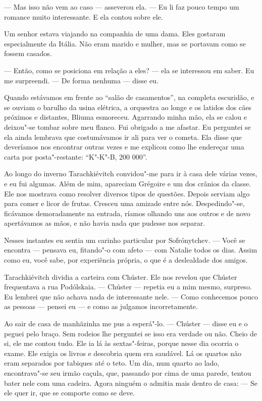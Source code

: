 --- Mas isso não vem ao caso --- asseverou ela. --- Eu li faz pouco
tempo um romance muito interessante. E ela contou sobre ele.

Um senhor estava viajando na companhia de uma dama. Eles gostaram
especialmente da Itália. Não eram marido e mulher, mas se portavam como
se fossem casados.

--- Então, como se posiciona em relação a eles? --- ela se interessou em
saber. Eu me surpreendi. --- De forma nenhuma --- disse eu.

Quando estávamos em frente ao ``salão de casamentos'', na completa
escuridão, e se ouviam o barulho da usina elétrica, a orquestra ao longe
e os latidos dos cães próximos e distantes, Bliuma esmoreceu. Agarrando
minha mão, ela se calou e deixou"-se tombar sobre meu flanco. Fui
obrigado a me afastar. Eu perguntei se ela ainda lembrava que
costumávamos ir ali para ver o cometa. Ela disse que deveríamos nos
encontrar outras vezes e me explicou como lhe endereçar uma carta por
posta"-restante: ``K"-K"-B, 200 000''.

Ao longo do inverno Tarachkiévitch convidou"-me para ir à casa dele
várias vezes, e eu fui algumas. Além de mim, apareciam Grégoire e um dos
crânios da classe. Ele nos mostrava como resolver diversos tipos de
questões. Depois serviam algo para comer e licor de frutas. Cresceu uma
amizade entre nós. Despedindo"-se, ficávamos demoradamente na entrada,
ríamos olhando uns aos outros e de novo apertávamos as mãos, e não havia
nada que pudesse nos separar.

Nesses instantes eu sentia um carinho particular por Sofrónytchev. ---
Você se encontra --- pensava eu, fitando"-o com afeto --- com Natalie
todos os dias. Assim como eu, você sabe, por experiência própria, o que
é a deslealdade dos amigos.

Tarachkiévitch dividia a carteira com Chúster. Ele nos revelou que
Chúster frequentava a rua Podólskaia. --- Chúster --- repetia eu a mim
mesmo, surpreso. Eu lembrei que não achava nada de interessante nele.
--- Como conhecemos pouco as pessoas --- pensei eu --- e como as
julgamos incorretamente.

Ao sair de casa de manhãzinha me pus a esperá"-lo. --- Chúster --- disse
eu e o peguei pelo braço. Sem rodeios lhe perguntei se isso era verdade
ou não. Cheio de si, ele me contou tudo. Ele ia lá às sextas"-feiras,
porque nesse dia ocorria o exame. Ele exigia os livros e descobria quem
era saudável. Lá os quartos não eram separados por tabiques até o teto.
Um dia, num quarto ao lado, encontrava"-se seu irmão caçula, que,
passando por cima de uma parede, tentou bater nele com uma cadeira.
Agora ninguém o admitia mais dentro de casa: --- Se ele quer ir, que se
comporte como se deve.

